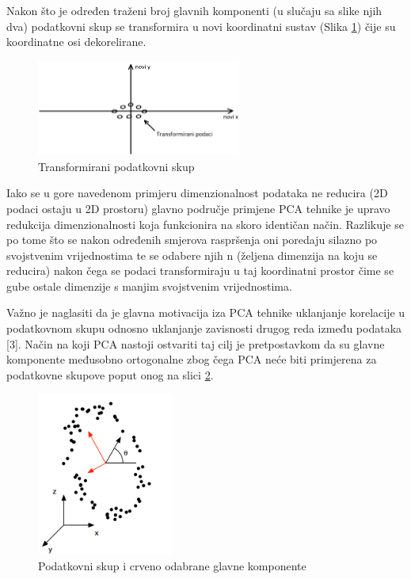 \documentclass[times, utf8, proizvoljni, numeric]{fer}
\begin{document}
Nakon što je određen traženi broj glavnih komponenti (u slučaju sa slike njih dva) podatkovni skup se transformira u novi koordinatni sustav (Slika \ref{fg:pca_end}) čije su koordinatne osi dekorelirane.

\begin{figure}[H]
	\begin{center}
		\captionsetup{justification=centering}
		\includegraphics[width=0.6\textwidth]{./imgs/pca_end.png}
		\caption{Transformirani podatkovni skup}
		\label{fg:pca_end}
	\end{center}
\end{figure}

Iako se u gore navedenom primjeru dimenzionalnost podataka ne reducira (2D podaci ostaju u 2D prostoru) glavno područje primjene PCA tehnike je upravo redukcija dimenzionalnosti koja funkcionira na skoro identičan način. Razlikuje se po tome što se nakon određenih smjerova raspršenja oni poredaju silazno po svojstvenim vrijednostima te se odabere njih n (željena dimenzija na koju se reducira) nakon čega se podaci transformiraju u taj koordinatni prostor čime se gube ostale dimenzije s manjim svojstvenim vrijednostima. 

Važno je naglasiti da je glavna motivacija iza PCA tehnike uklanjanje korelacije u podatkovnom skupu odnosno uklanjanje zavisnosti drugog reda između podataka [3]. Način na koji PCA nastoji ostvariti taj cilj je pretpostavkom da su glavne komponente međusobno ortogonalne zbog čega PCA neće biti primjerena za podatkovne skupove poput onog na slici \ref{fg:pca_problem}.

\begin{figure}[H]
	\begin{center}
		\captionsetup{justification=centering}
		\includegraphics[width=0.4\textwidth]{./imgs/pca_problem.png}
		\caption{Podatkovni skup i crveno odabrane glavne komponente \cite{PCA}}
		\label{fg:pca_problem}
	\end{center}
\end{figure}
\end{document}
